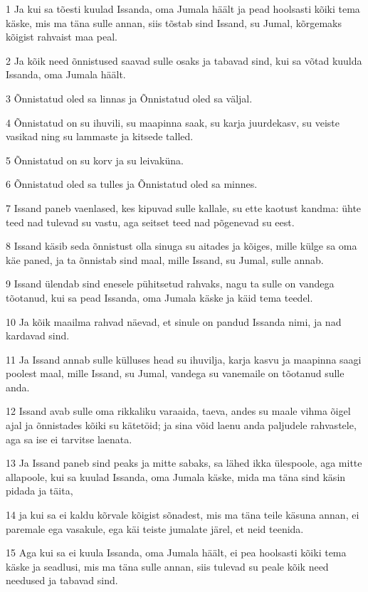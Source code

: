 \par 1 Ja kui sa tõesti kuulad Issanda, oma Jumala häält ja pead hoolsasti kõiki tema käske, mis ma täna sulle annan, siis tõstab sind Issand, su Jumal, kõrgemaks kõigist rahvaist maa peal.
\par 2 Ja kõik need õnnistused saavad sulle osaks ja tabavad sind, kui sa võtad kuulda Issanda, oma Jumala häält.
\par 3 Õnnistatud oled sa linnas ja Õnnistatud oled sa väljal.
\par 4 Õnnistatud on su ihuvili, su maapinna saak, su karja juurdekasv, su veiste vasikad ning su lammaste ja kitsede talled.
\par 5 Õnnistatud on su korv ja su leivaküna.
\par 6 Õnnistatud oled sa tulles ja Õnnistatud oled sa minnes.
\par 7 Issand paneb vaenlased, kes kipuvad sulle kallale, su ette kaotust kandma: ühte teed nad tulevad su vastu, aga seitset teed nad põgenevad su eest.
\par 8 Issand käsib seda õnnistust olla sinuga su aitades ja kõiges, mille külge sa oma käe paned, ja ta õnnistab sind maal, mille Issand, su Jumal, sulle annab.
\par 9 Issand ülendab sind enesele pühitsetud rahvaks, nagu ta sulle on vandega tõotanud, kui sa pead Issanda, oma Jumala käske ja käid tema teedel.
\par 10 Ja kõik maailma rahvad näevad, et sinule on pandud Issanda nimi, ja nad kardavad sind.
\par 11 Ja Issand annab sulle külluses head su ihuvilja, karja kasvu ja maapinna saagi poolest maal, mille Issand, su Jumal, vandega su vanemaile on tõotanud sulle anda.
\par 12 Issand avab sulle oma rikkaliku varaaida, taeva, andes su maale vihma õigel ajal ja õnnistades kõiki su kätetöid; ja sina võid laenu anda paljudele rahvastele, aga sa ise ei tarvitse laenata.
\par 13 Ja Issand paneb sind peaks ja mitte sabaks, sa lähed ikka ülespoole, aga mitte allapoole, kui sa kuulad Issanda, oma Jumala käske, mida ma täna sind käsin pidada ja täita,
\par 14 ja kui sa ei kaldu kõrvale kõigist sõnadest, mis ma täna teile käsuna annan, ei paremale ega vasakule, ega käi teiste jumalate järel, et neid teenida.
\par 15 Aga kui sa ei kuula Issanda, oma Jumala häält, ei pea hoolsasti kõiki tema käske ja seadlusi, mis ma täna sulle annan, siis tulevad su peale kõik need needused ja tabavad sind.
